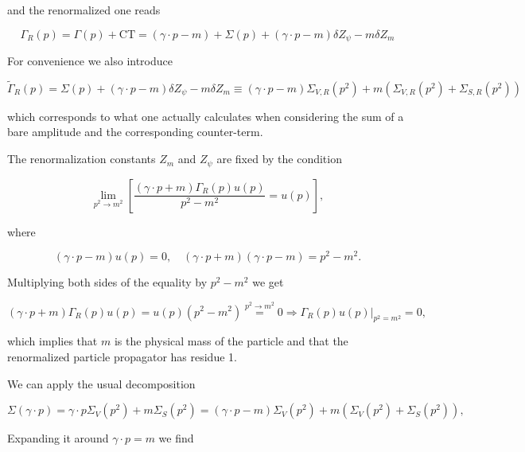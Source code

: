 \documentclass[../FeynCalcManual.tex]{subfiles}
\begin{document}
and the renormalized one reads

\begin{equation}
    \Gamma_R(p) = \Gamma(p) + \textrm{CT} =  (\gamma \cdot p - m)  + \Sigma(p) + (\gamma \cdot p - m) \delta Z_{\psi} - m  \delta Z_{m} 
\end{equation}

For convenience we also introduce

\begin{equation}
        \tilde{\Gamma}_R(p) = \Sigma(p) + (\gamma \cdot p - m) \delta Z_{\psi} - m  \delta Z_{m} \equiv (\gamma \cdot p - m) {\Sigma}_{V,R}(p^2) + m ({\Sigma}_{V,R}(p^2) + {\Sigma}_{S,R}(p^2))
\end{equation}

which corresponds to what one actually calculates when considering the
sum of a bare amplitude and the corresponding counter-term.

The renormalization constants \(Z_m\) and \(Z_\psi\) are fixed by the
condition

\begin{equation}
    \lim_{p^2 \to m^2} \left [ \frac{(\gamma \cdot p + m )\Gamma_R (p) u(p)}{p^2-m^2}  = u(p) \right ],
\end{equation}

where

\begin{equation}
        (\gamma \cdot p-m) u (p) = 0, \quad  (\gamma \cdot p+m) (\gamma \cdot p-m) = p^2 - m^2.
\end{equation}

Multiplying both sides of the equality by \(p^2-m^2\) we get

\begin{equation}
        (\gamma \cdot p + m )\Gamma_R (p) u(p) = u(p)( p^2-m^2) \overset{p^2 \to m^2}{=} 0 \Rightarrow \Gamma_R (p) u(p) \biggl|_{p^2=m^2}  = 0,
\end{equation}

which implies that \(m\) is the physical mass of the particle and that
the renormalized particle propagator has residue 1.

We can apply the usual decomposition

\begin{equation}
    \Sigma (\gamma \cdot p) = \gamma \cdot p \Sigma_V (p^2) + m \Sigma_S (p^2) = (\gamma \cdot p -m) \Sigma_V (p^2) + m (\Sigma_V (p^2) + \Sigma_S (p^2)) ,
\end{equation}

Expanding it around \(\gamma \cdot p=m\) we find
\end{document}
